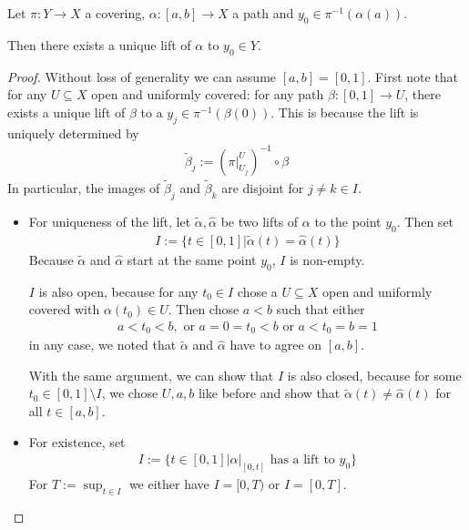 \begin{lem}[]\label{lem:path-lift}
  Let $\pi: Y \to X$ a covering, $\alpha:[a,b] \to X$ a path and $y_0 \in \pi^{-1}(\alpha(a))$.
  
  Then there exists a unique lift of $\alpha$ to $y_0 \in Y$.
\end{lem}
\begin{proof}
  Without loss of generality we can assume $[a,b] = [0,1]$.
  First note that for any $U \subseteq X$ open and uniformly covered: 
  for any path $\beta:[0,1] \to U$, there exists a unique lift of $\beta$ to a $y_j \in \pi^{-1}(\beta(0))$.
  This is because the lift is uniquely determined by
  \begin{align*}
    \tilde{\beta}_j := \left(
      \pi|_{U_j}^{U}
    \right)^{-1} \circ \beta
  \end{align*}
  In particular, the images of $\tilde{\beta}_j$ and $\tilde{\beta}_k$ are disjoint for $j \neq k \in I$.
  \begin{itemize}
    \item For uniqueness of the lift, let $\tilde{\alpha}, \hat{\alpha}$ be two lifts of $\alpha$ to the point $y_0$.
      Then set
      \begin{align*}
        I := \{t \in [0,1] \big\vert \tilde{\alpha}(t) = \hat{\alpha}(t)\}
      \end{align*}
      Because $\tilde{\alpha}$ and $\hat{\alpha}$ start at the same point $y_0$, $I$ is non-empty.

      $I$ is also open, because for any $t_0 \in I$ chose a $U \subseteq X$ open and uniformly covered with $\alpha(t_0) \in U$.
      Then chose $a < b$ such that either
      \begin{align*}
        a < t_0 < b, \text{ or } a = 0 = t_0 < b \text{ or } a < t_0 = b = 1
      \end{align*}
      in any case, we noted that $\tilde{\alpha}$ and $\hat{\alpha}$ have to agree on $[a,b]$. 

      With the same argument, we can show that $I$ is also closed, because for some $t_0 \in [0,1] \setminus I$, we chose $U,a,b$ like before and show that $\tilde{\alpha}(t) \neq \hat{\alpha}(t)$ for all $t \in [a,b]$.
    \item For existence, set
      \begin{align*}
        I := \{t \in [0,1] \big\vert \alpha|_{[0,t]} \text{ has a lift to $y_0$}\}
      \end{align*}
      For $T := \sup_{t \in I}$ we either have $I = [0,T)$ or $I=[0,T]$.


\end{itemize}
\end{proof}
